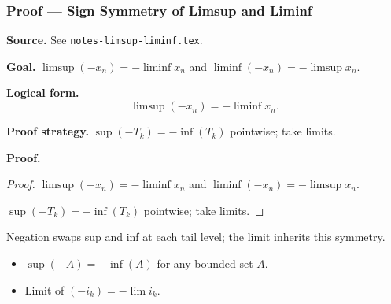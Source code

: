 
\clearpage
{}
\hypertarget{proof-RA-ABB-T-limsup-sign-sym}{}

\subsubsection[Sign Symmetry of Limsup and Liminf]{Proof --- Sign Symmetry of Limsup and Liminf}

\bigskip

\noindent
\textbf{Source.} See \texttt{notes-limsup-liminf.tex}.

\vspace{0.75em}

\noindent
\textbf{Goal.} $\limsup(-x_n) = -\liminf x_n$ and $\liminf(-x_n) = -\limsup x_n$.

\vspace{0.75em}

\noindent
\textbf{Logical form.}
\[
  \limsup(-x_n) = -\liminf x_n.
\]

\vspace{0.75em}

\noindent
\textbf{Proof strategy.} $\sup(-T_k) = -\inf(T_k)$ pointwise; take limits.

\vspace{0.75em}

\noindent
\textbf{Proof.}
\begin{proof}
\Claim $\limsup(-x_n) = -\liminf x_n$ and $\liminf(-x_n) = -\limsup x_n$.

\Given 

\Goal 

\Strategy $\sup(-T_k) = -\inf(T_k)$ pointwise; take limits.

\medskip


\end{proof}

\begin{remark*}
Negation swaps sup and inf at each tail level; the limit inherits this symmetry.
\end{remark*}

\begin{remark*}[Dependencies]
\begin{itemize}
  \item $\sup(-A) = -\inf(A)$ for any bounded set $A$.
  \item Limit of $(-i_k) = -\lim i_k$.
\end{itemize}
\end{remark*}
